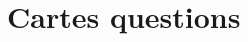 \documentclass[a4paper]{article}
\begin{document}


\section{Cartes questions}
\thispagestyle{empty}



\restoregeometry
\end{document}

